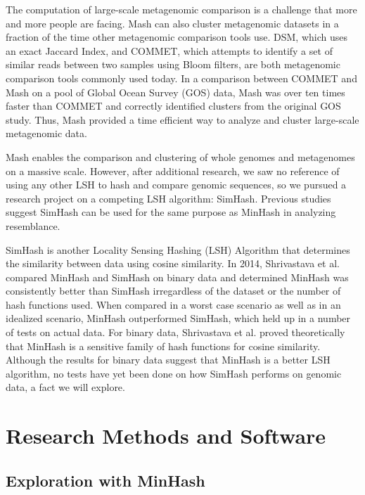 \documentclass[12pt, letterpaper]{article}
\begin{document}
The computation of large-scale metagenomic comparison is a challenge that more and more people are facing. Mash can also cluster metagenomic datasets in a fraction of the time other metagenomic comparison tools use. DSM, which uses an exact Jaccard Index, and COMMET, which attempts to identify a set of similar reads between two samples using Bloom filters, are both metagenomic comparison tools commonly used today. In a comparison between COMMET and Mash on a pool of Global Ocean Survey (GOS) data, Mash was over ten times faster than COMMET and correctly identified clusters from the original GOS study. Thus, Mash provided a time efficient way to analyze and cluster large-scale metagenomic data.

Mash enables the comparison and clustering of whole genomes and metagenomes on a massive scale. However, after additional research, we saw no reference of using any other LSH to hash and compare genomic sequences, so we pursued a research project on a competing LSH algorithm: SimHash. Previous studies suggest SimHash can be used for the same purpose as MinHash in analyzing resemblance. 

SimHash is another Locality Sensing Hashing (LSH) Algorithm that determines the similarity between data using cosine similarity. In 2014, Shrivastava et al. compared MinHash and SimHash on binary data and determined MinHash was consistently better than SimHash irregardless of the dataset or the number of hash functions used.\cite{MinvsSim} When compared in a worst case scenario as well as in an idealized scenario, MinHash outperformed SimHash, which held up in a number of tests on actual data. For binary data, Shrivastava et al. proved theoretically that MinHash is a sensitive family of hash functions for cosine similarity. Although the results for binary data suggest that MinHash is a better LSH algorithm, no tests have yet been done on how SimHash performs on genomic data, a fact we will explore.

\section{Research Methods and Software}

\subsection{Exploration with MinHash}
\end{document}
